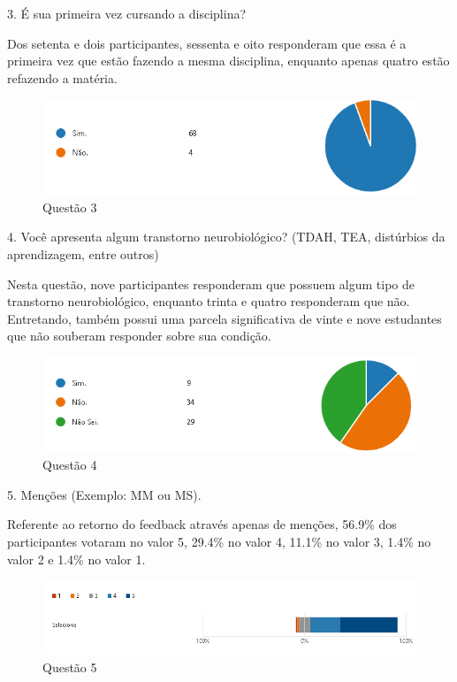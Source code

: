 3. É sua primeira vez cursando a disciplina?

Dos setenta e dois participantes, sessenta e oito responderam que essa é a primeira vez que estão fazendo a mesma disciplina, enquanto apenas quatro estão refazendo a matéria.

\begin{figure}[H]
\centering
\includegraphics[scale=0.5]{figuras/3.png}
\caption{Questão 3}
\end{figure}

4. Você apresenta algum transtorno neurobiológico? (TDAH, TEA, distúrbios da aprendizagem, entre outros)

Nesta questão, nove participantes responderam que possuem algum tipo de transtorno neurobiológico, enquanto trinta e quatro responderam que não. Entretando, também possui uma parcela significativa de vinte e nove estudantes que não souberam responder sobre sua condição.

\begin{figure}[H]
\centering
\includegraphics[scale=0.6]{figuras/4.png}
\caption{Questão 4}
\end{figure}

5. Menções (Exemplo: MM ou MS).

Referente ao retorno do feedback através apenas de menções, 56.9\% dos participantes votaram no valor 5, 29.4\% no valor 4, 11.1\% no valor 3, 1.4\% no valor 2 e 1.4\% no valor 1.

\begin{figure}[H]
\centering
\includegraphics[scale=0.6]{figuras/5.png}
\caption{Questão 5}
\end{figure}

